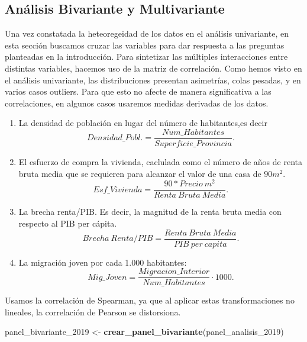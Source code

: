 \documentclass[,article,submit,moreauthors,pdftex]{Definitions/mdpi}
\newenvironment{Shaded}{\begin{snugshade}}{\end{snugshade}}
\newcommand{\FunctionTok}[1]{\textcolor[rgb]{0.13,0.29,0.53}{\textbf{#1}}}
\newcommand{\NormalTok}[1]{#1}
\newcommand{\OtherTok}[1]{\textcolor[rgb]{0.56,0.35,0.01}{#1}}
\newcommand{\SpecialCharTok}[1]{\textcolor[rgb]{0.81,0.36,0.00}{\textbf{#1}}}
\begin{document}
\subsection{Análisis Bivariante y
Multivariante}\label{anuxe1lisis-bivariante-y-multivariante}

Una vez constatada la heteoregeidad de los datos en el análisis
univariante, en esta sección buscamos cruzar las variables para dar
respuesta a las preguntas planteadas en la introducción. Para sintetizar
las múltiples interacciones entre distintas variables, hacemos uso de la
matriz de correlación. Como hemos visto en el análisis univariante, las
distribuciones presentan asimetrías, colas pesadas, y en varios casos
outliers. Para que esto no afecte de manera significativa a las
correlaciones, en algunos casos usaremos medidas derivadas de los datos.

\begin{enumerate}
\def\labelenumi{\arabic{enumi}.}
\item
  La densidad de población en lugar del número de habitantes,es decir
  \[Densidad\_Pobl. = \frac{Num\_Habitantes}{Superficie\_Provincia}.\]
\item
  El esfuerzo de compra la vivienda, caclulada como el número de años de
  renta bruta media que se requieren para alcanzar el valor de una casa
  de \(90 m^2\).
  \[Esf\_Vivienda = \frac{90*Precio~m^2}{Renta~Bruta~Media}.\]
\item
  La brecha renta/PIB. Es decir, la magnitud de la renta bruta media con
  respecto al PIB per cápita.
  \[Brecha~ Renta/PIB = \frac{Renta~Bruta~Media}{PIB~per~capita}.\]
\item
  La migración joven por cada 1.000 habitantes:
  \[Mig\_Joven = \frac{Migracion\_Interior}{Num\_Habitantes}\cdot 1000.\]
\end{enumerate}

Usamos la correlación de Spearman, ya que al aplicar estas
transformaciones no lineales, la correlación de Pearson se distorsiona.

\begin{Shaded}
\begin{Highlighting}[]
\NormalTok{panel\_bivariante\_2019 }\OtherTok{\textless{}{-}} \FunctionTok{crear\_panel\_bivariante}\NormalTok{(panel\_analisis\_2019)}
\end{Highlighting}
\end{Shaded}

\begin{Shaded}
\end{Shaded}
\end{document}
